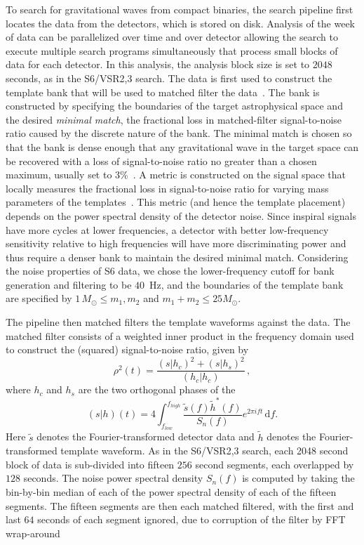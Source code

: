 \documentclass[12pt]{iopart} \usepackage{graphicx,amssymb}
\begin{document}
To search for gravitational waves from compact binaries, the search pipeline
first locates the data from the detectors, which is stored on disk. Analysis
of the week of data can be parallelized over time and over detector allowing
the search to execute multiple search programs simultaneously that process
small blocks of data for each detector. In this analysis, the
analysis block size is set to $2048$ seconds, as in the S6/VSR2,3 search.
The data is first used to construct the
template bank that will be used to matched filter the
data~\cite{Sathyaprakash:1991mt,Dhurandhar:1992mw,Owen:1995tm,Owen:1998dk,Babak:2006ty}.
The bank is constructed by specifying the boundaries of the target
astrophysical space and the desired \emph{minimal match}, the fractional loss in
matched-filter signal-to-noise ratio caused by the discrete nature of the bank.
The minimal match is chosen so that the bank is dense enough that any
gravitational wave in the target space can be recovered with a loss of
signal-to-noise ratio no greater than a chosen maximum, usually set to 3\%~\cite{Abbott:2011ys}. 
A metric is constructed on the signal space that
locally measures the fractional loss in signal-to-noise ratio for varying mass
parameters of the templates~\cite{Owen:1998dk}.  This metric (and hence
the template placement) depends on the power spectral density of the
detector noise. Since inspiral signals have more cycles at lower frequencies,
a detector with better low-frequency sensitivity relative to high frequencies
will have more discriminating power and thus require a denser bank to maintain
the desired minimal match. Considering the noise properties of S6 data, we chose the
lower-frequency cutoff for bank generation and filtering to be $40$~Hz, and
the boundaries of the template bank are specified by $1\, M_\odot \le m_1,
m_2$ and $m_1 + m_2 \le 25 M_\odot$.

The pipeline then matched filters the template waveforms against the data.
 The matched filter consists of a weighted inner product in the frequency
domain used to construct the (squared) signal-to-noise ratio, given by
%
\begin{equation}
\rho^2(t) = \frac{(s|h_c)^2 + (s|h_s)^2}{(h_c|h_c)} \, ,
\label{eq:snr}
\end{equation}
%
where $h_c$ and $h_s$ are the two orthogonal phases of the 
%
\begin{equation}
(s|h)(t) = 4\int_{f_{low}}^{f_{high}} \frac{\tilde{s}(f)\tilde{h}^*(f)}{S_n (f)}e^{2\pi i f t}\, \mathrm{d}f.
\label{eq:ip}
\end{equation}
%
Here $\tilde{s}$ denotes the Fourier-transformed detector data and $\tilde{h}$
denotes the Fourier-transformed template waveform. As in the S6/VSR2,3 search,
each 2048 second block of data is sub-divided into fifteen $256$ second
segments, each overlapped by $128$ seconds. The noise power spectral
density $S_n(f)$ is computed by taking the bin-by-bin median of each of the power
spectral density of each of the fifteen segments. The fifteen segments are then each
matched filtered, with the first and last $64$ seconds of each segment
ignored, due to corruption of the filter by FFT
wrap-around~\cite{Allen:2005fk}
\end{document}
